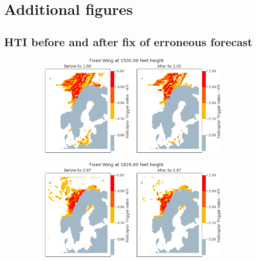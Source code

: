 \appendix
\chapter{Additional figures}\label{app:A}
\label{A1}

\section{HTI before and after fix of erroneous forecast}
\begin{figure}[H]
    \begin{subfigure}{0.45\textwidth}
    \centering
    \includegraphics[width=\textwidth]{Figures/03.png}
    \caption{}
    \label{fig:HTI03}
    \end{subfigure}
    \hfill
    \begin{subfigure}{0.45\textwidth}
    \centering
    \includegraphics[width=\textwidth]{Figures/08.png}
    \caption{}
    \label{fig:HTI08}
    \end{subfigure}


\end{figure}
